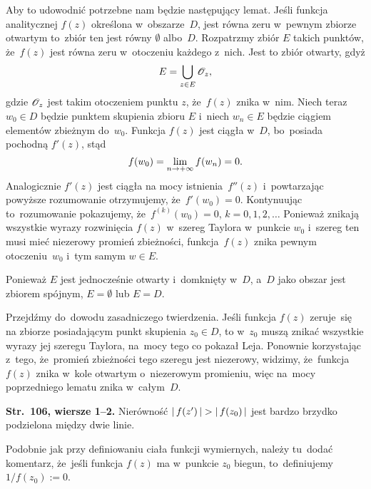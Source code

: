 \documentclass[a4paper,11pt]{article}
\begin{document}
Aby to udowodnić potrzebne nam będzie następujący lemat. Jeśli funkcja
analitycznej $f( z )$ określona w~obszarze~$D$, jest równa zeru
w~pewnym zbiorze otwartym to~zbiór ten jest równy $\emptyset$
albo~$D$. Rozpatrzmy zbiór $E$ takich punktów, że~$f( z )$ jest równa
zeru w~otoczeniu każdego z~nich. Jest to zbiór otwarty, gdyż
\begin{equation}
  \label{eq:Leja-40}
  E = \bigcup_{ z \in E } \mathcal{O}_{ z },
\end{equation}
gdzie $\mathcal{O}_{ z }$ jest takim otoczeniem punktu $z$, że~$f( z )$ znika
w~nim. Niech teraz $w_{ 0 } \in D$ będzie punktem skupienia zbioru $E$
i~niech $w_{ n } \in E$ będzie ciągiem elementów zbieżnym
do~$w_{ 0 }$. Funkcja $f( z )$ jest ciągła w~$D$, bo~posiada pochodną
$f'( z )$, stąd
\begin{equation}
  \label{eq:Leja-41}
  f( w_{ 0 } ) = \lim\limits_{ n \to +\infty } f( w_{ n } ) = 0.
\end{equation}
Analogicznie $f'( z )$ jest ciągła na mocy istnienia~$f''( z )$
i~powtarzając powyższe rozumowanie otrzymujemy,
że~$f'( w_{ 0 } ) = 0$. Kontynuując to~rozumowanie pokazujemy,
że~$f^{ ( k ) }( w_{ 0 } ) = 0$, $k = 0, 1, 2, \ldots$ Ponieważ
znikają wszystkie wyrazy rozwinięcia $f( z )$ w~szereg Taylora
w~punkcie $w_{ 0 }$ i~szereg ten musi mieć niezerowy promień
zbieżności, funkcja~$f( z )$ znika pewnym otoczeniu~$w_{ 0 }$ i~tym
samym $w \in E$.

Ponieważ $E$ jest jednocześnie otwarty i~domknięty w~$D$, a~$D$ jako
obszar jest zbiorem spójnym, $E = \emptyset$ lub $E = D$.

Przejdźmy do~dowodu zasadniczego twierdzenia. Jeśli funkcja $f( z )$
zeruje~się na zbiorze posiadającym punkt skupienia $z_{ 0 } \in D$, to
w~$z_{ 0 }$ muszą znikać wszystkie wyrazy jej szeregu Taylora, na~mocy
tego co pokazał Leja. Ponownie korzystając z~tego, że~promień
zbieżności tego szeregu jest niezerowy, widzimy, że~funkcja~$f( z )$
znika w~kole otwartym o~niezerowym promieniu, więc na~mocy
poprzedniego lematu znika w~całym~$D$.

\vspace{\spaceFour}


\start \textbf{Str.~106, wiersze 1--2.} Nierówność
$\left| \,  f( z' )  \, \right| > \left| \,  f( z_{ 0 } )  \, \right|$ jest bardzo brzydko
podzielona między dwie linie.

\vspace{\spaceFour}


\start {} Podobnie jak przy definiowaniu ciała funkcji
wymiernych, należy tu~dodać komentarz, że~jeśli funkcja $f( z )$ ma
w~punkcie $z_{ 0 }$ biegun, to~definiujemy $1 / f( z_{ 0 } ) := 0$.
\end{document}
